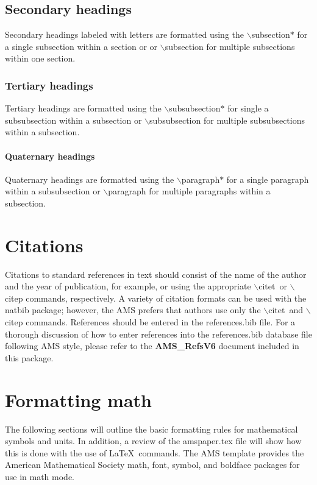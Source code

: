 \documentclass{ametsocV6.2}
\begin{document}
\subsection*{Secondary headings} 
Secondary headings labeled with letters are formatted using the
$\backslash$subsection$*${\tt\string{\string}} for a single
subsection within a section or
or $\backslash$subsection{\tt\string{\string}} 
for multiple
subsections within one section.

\subsubsection*{Tertiary headings} 
Tertiary headings are formatted using the
$\backslash$subsubsection$*${\tt\string{\string}} for single a subsubsection
within a subsection or
$\backslash$subsubsection{\tt\string{\string}} 
for multiple subsubsections
within a subsection. 

\paragraph*{Quaternary headings} 
Quaternary headings are formatted using the
$\backslash$paragraph$*${\tt\string{\string}} for a single paragraph within
a subsubsection or
$\backslash$paragraph{\tt\string{\string}} 
for multiple paragraphs
within a subsection.

\section{Citations}
Citations to standard references in text should consist of the name of the
author and the year of publication, for example, \citet{Becker+Schmitz2003} or
\citep{Becker+Schmitz2003} using the appropriate $\backslash$citet\ or
$\backslash$citep commands, respectively. A variety of citation formats can
be used with the natbib package; however, the AMS prefers that authors use only the $\backslash$citet\ and
$\backslash$citep commands. References should be entered in the references.bib file. For a thorough
discussion of how to enter references into the references.bib database file
following AMS style, please refer to the \textbf{AMS\_RefsV6} document
included in this package.

\section{Formatting math}
The following sections will outline the basic formatting rules for
mathematical symbols and units.  In addition, a review of the amspaper.tex
file will show how this is done with the use of \LaTeX\ commands.  The AMS
template provides the American Mathematical Society math, font, symbol, and
boldface packages for use in math mode.
\end{document}
